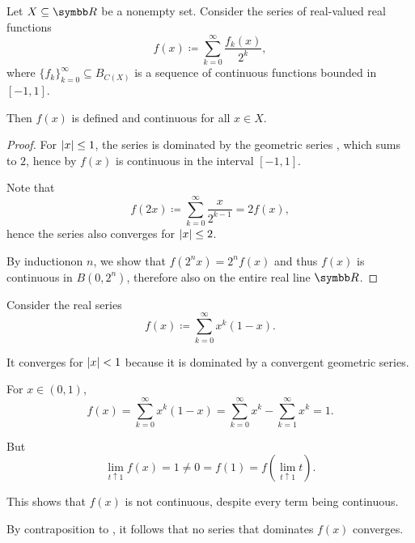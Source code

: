\begin{corollary}\label{thm:continuous_function_series_powers_of_two}
  Let \( X \subseteq \BR \) be a nonempty set. Consider the series of real-valued real functions
  \begin{equation}\label{thm:continuous_function_series_powers_of_two/series}
    f(x) \coloneqq \sum_{k=0}^\infty \frac {f_k(x)} {2^k},
  \end{equation}
  where \( \{ f_k \}_{k=0}^\infty \subseteq B_{C(X)} \) is a sequence of continuous functions bounded in \( [-1, 1] \).

  Then \( f(x) \) is defined and continuous for all \( x \in X \).
\end{corollary}
\begin{proof}
  For \( \left\vert x \right\vert \leq 1 \), the series is dominated by the geometric series , which sums to \( 2 \), hence by  \( f(x) \) is continuous in the interval \( [-1, 1] \).

  Note that
  \begin{equation*}
    f(2x) \coloneqq \sum_{k=0}^\infty \frac x {2^{k-1}} = 2 f(x),
  \end{equation*}
  hence the series  also converges for \( \left\vert x \right\vert \leq 2 \).

  By induction\IND on \( n \), we show that \( f(2^n x) = 2^n f(x) \) and thus \( f(x) \) is continuous in \( B(0, 2^n) \), therefore also on the entire real line \( \BR \).
\end{proof}

\begin{example}\label{thm:weierstrass_series_criterion/counterexample}\cite[]{Фихтенгольц1968/2}
  Consider the real series
  \begin{equation*}
    f(x) \coloneqq \sum_{k=0}^\infty x^k (1 - x).
  \end{equation*}

  It converges for \( \left\vert x \right\vert < 1 \) because it is dominated by a convergent geometric series.

  For \( x \in (0, 1) \),
  \begin{equation*}
    f(x)
    =
    \sum_{k=0}^\infty x^k (1 - x)
    =
    \sum_{k=0}^\infty x^k - \sum_{k=1}^\infty x^k
    =
    1.
  \end{equation*}

  But
  \begin{equation*}
    \lim_{t \uparrow 1} f(x) = 1 \neq 0 = f(1) = f(\lim_{t \uparrow 1} t).
  \end{equation*}

  This shows that \( f(x) \) is not continuous, despite every term being continuous.

  By contraposition to , it follows that no series that dominates \( f(x) \) converges.
\end{example}

